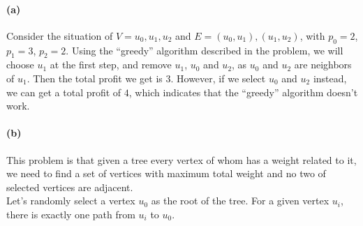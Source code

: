 \documentclass{6046}
\author{Lingfu Zhang}
\begin{document}
\paragraph{(a)}
Consider the situation of $V = {u_0, u_1, u_2}$ and $E = {(u_0, u_1), (u_1, u_2)}$, with 
$p_0 = 2$, $p_1 = 3$, $p_2 = 2$. 
Using the ``greedy'' algorithm described in the problem, 
we will choose $u_1$ at the first step, 
and remove $u_1$, $u_0$ and $u_2$, 
as $u_0$ and $u_2$ are neighbors of $u_1$. 
Then the total profit we get is $3$. 
However, if we select $u_0$ and $u_2$ instead, 
we can get a total profit of $4$, which indicates that the 
``greedy'' algorithm doesn't work. 

\paragraph{(b)}
This problem is that given a tree every vertex of whom has a weight related to it, 
we need to find a set of vertices with maximum total weight 
and no two of selected vertices are adjacent. 
\\
Let's randomly select a vertex $u_0$ as the root of the tree. 
For a given vertex $u_i$, there is exactly one path from $u_i$ to $u_0$. 
\\
\end{document}
